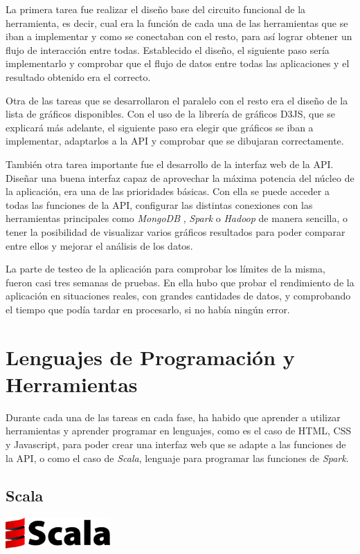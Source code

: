 La primera tarea fue realizar el diseño base del circuito funcional de la herramienta, es decir, cual era la función de cada una de las herramientas que se iban a implementar y como se conectaban con el resto, para así lograr obtener un flujo de interacción entre todas. Establecido el diseño, el siguiente paso sería implementarlo y comprobar que el flujo de datos entre todas las aplicaciones y el resultado obtenido era el correcto.

Otra de las tareas que se desarrollaron el paralelo con el resto era el diseño de la lista de gráficos disponibles. Con el uso de la librería de gráficos D3JS, que se explicará más adelante, el siguiente paso era elegir que gráficos se iban a implementar, adaptarlos a la API y comprobar que se dibujaran correctamente.

También otra tarea importante fue el desarrollo de la interfaz web de la API. Diseñar una buena interfaz capaz de aprovechar la máxima potencia del núcleo de la aplicación, era una de las prioridades básicas. Con ella se puede acceder a todas las funciones de la API, configurar las distintas conexiones con las herramientas principales como \textit{MongoDB} \cite{MongoInicial}, \textit{Spark} o \textit{Hadoop} de manera sencilla, o tener la posibilidad de visualizar varios gráficos resultados para poder comparar entre ellos y mejorar el análisis de los datos.

La parte de testeo de la aplicación para comprobar los límites de la misma, fueron casi tres semanas de pruebas. En ella hubo que probar el rendimiento de la aplicación en situaciones reales, con grandes cantidades de datos, y comprobando el tiempo que podía tardar en procesarlo, si no había ningún error.

\section{Lenguajes de Programación y Herramientas}

Durante cada una de las tareas en cada fase, ha habido que aprender a utilizar herramientas y aprender programar en lenguajes, como es el caso de HTML, CSS y Javascript, para poder crear una interfaz web que se adapte a las funciones de la API, o como el caso de \textit{Scala}, lenguaje para programar las funciones de \textit{Spark}.

\subsection{Scala}
\begin{minipage}{\textwidth}
	\centering
	\includegraphics[width=0.3\textwidth]{imagenes/scala_logo.jpg}\\[0.1cm]
\end{minipage}

